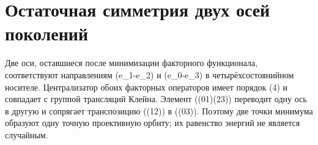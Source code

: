 \section*{Остаточная симметрия двух осей поколений}

Две оси, оставшиеся после минимизации факторного функционала, соответствуют
направлениям (e_1-e_2) и (e_0-e_3) в четырёхсостоянийном носителе.
Централизатор обоих факторных операторов имеет порядок (4) и совпадает с
группой трансляций Клейна. Элемент ((01)(23)) переводит одну ось в другую и
сопрягает транспозицию ((12)) в ((03)). Поэтому две точки минимума образуют
одну точную проективную орбиту; их равенство энергий не является случайным.